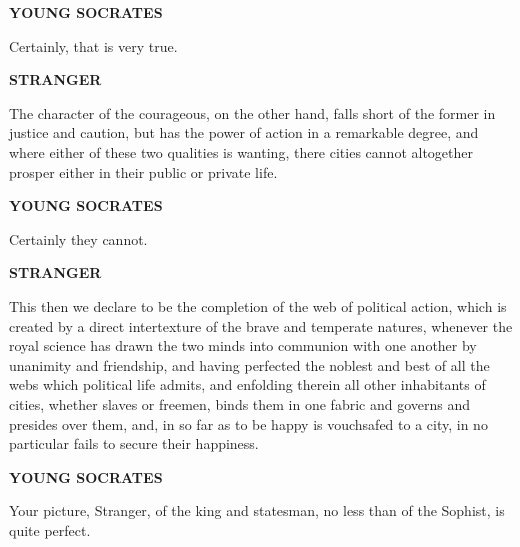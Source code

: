 \documentclass[11pt,letter]{article}
\begin{document}
\par \textbf{YOUNG SOCRATES}
\par   Certainly, that is very true.

\par \textbf{STRANGER}
\par   The character of the courageous, on the other hand, falls short of the former in justice and caution, but has the power of action in a remarkable degree, and where either of these two qualities is wanting, there cities cannot altogether prosper either in their public or private life.

\par \textbf{YOUNG SOCRATES}
\par   Certainly they cannot.

\par \textbf{STRANGER}
\par   This then we declare to be the completion of the web of political action, which is created by a direct intertexture of the brave and temperate natures, whenever the royal science has drawn the two minds into communion with one another by unanimity and friendship, and having perfected the noblest and best of all the webs which political life admits, and enfolding therein all other inhabitants of cities, whether slaves or freemen, binds them in one fabric and governs and presides over them, and, in so far as to be happy is vouchsafed to a city, in no particular fails to secure their happiness.

\par \textbf{YOUNG SOCRATES}
\par   Your picture, Stranger, of the king and statesman, no less than of the Sophist, is quite perfect.

\par 
 
\end{document}
